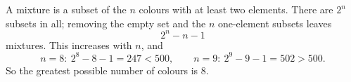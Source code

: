 A mixture is a subset of the $n$ colours with at least two elements. There are $2^n$ subsets in all; removing the empty set and the $n$ one-element subsets leaves
\[2^n-n-1\]
mixtures. This increases with $n$, and
\[n=8:\ 2^8-8-1=247<500,\qquad n=9:\ 2^9-9-1=502>500.\]
So the greatest possible number of colours is $\boxed{8}$.

